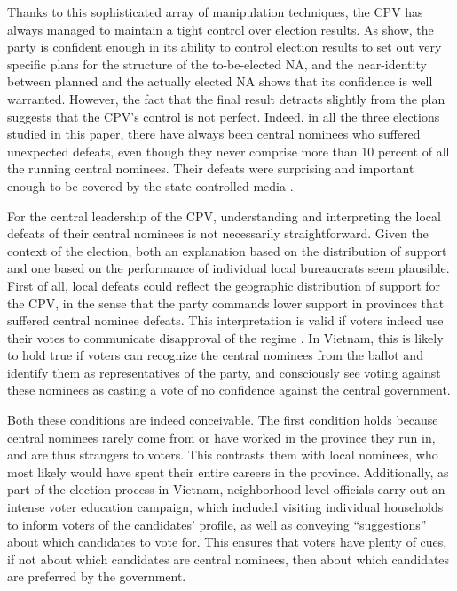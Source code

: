 \documentclass[12pt]{article}\usepackage[]{graphicx}\usepackage[]{color}
\newcommand{\1}{\mathbbm{1}}
\begin{document}
Thanks to this sophisticated array of manipulation techniques, the CPV has always managed to maintain a tight control over election results. As \cite{MaleskySchuler2011} show, the party is confident enough in its ability to control election results to set out very specific plans for the structure of the to-be-elected NA, and the near-identity between planned and the actually elected NA shows that its confidence is well warranted. However, the fact that the final result detracts slightly from the plan suggests that the CPV's control is not perfect. Indeed, in all the three elections studied in this paper, there have always been central nominees who suffered unexpected defeats, even though they never comprise more than 10 percent of all the running central nominees. Their defeats were surprising and important enough to be covered by the state-controlled media \citep[e.g][]{vov2016, laodong2016}.

For the central leadership of the CPV, understanding and interpreting the local defeats of their central nominees is not necessarily straightforward. Given the context of the election, both an explanation based on the distribution of support and one based on the performance of individual local bureaucrats seem plausible. First of all, local defeats could reflect the geographic distribution of support for the CPV, in the sense that the party commands lower support in provinces that suffered central nominee defeats. This interpretation is valid if voters indeed use their votes to communicate disapproval of the regime \citep{someone, whoever}. In Vietnam, this is likely to hold true if voters can recognize the central nominees from the ballot and identify them as representatives of the party, and consciously see voting against these nominees as casting a vote of no confidence against the central government. 

Both these conditions are indeed conceivable. The first condition holds because central nominees rarely come from or have worked in the province they run in, and are thus strangers to voters. This contrasts them with local nominees, who most likely would have spent their entire careers in the province. Additionally, as part of the election process in Vietnam, neighborhood-level officials carry out an intense voter education campaign, which included visiting individual households to inform voters of the candidates' profile, as well as conveying ``suggestions'' about which candidates to vote for. This ensures that voters have plenty of cues, if not about which candidates are central nominees, then about which candidates are preferred by the government. 
\end{document}
